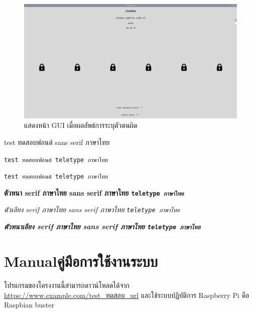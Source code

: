\begin{figure}[!ht]
    \begin{center}
      \includegraphics[scale=.4]{pic/comfirm_page.png}
      \caption[wrong predict]{แสดงหน้า GUI เมื่อผลลัพธ์การระบุตัวตนผิด}
      \label{fig:com_page}
    \end{center}
  \end{figure}



\newpage

\textsf{test ทดสอบฟอนต์ sans serif ภาษาไทย}

\verb+test ทดสอบฟอนต์ teletype ภาษาไทย+

\texttt{test ทดสอบฟอนต์ teletype ภาษาไทย}

\textbf{ตัวหนา serif ภาษาไทย \textsf{sans serif ภาษาไทย} \texttt{teletype ภาษาไทย}}

\textit{ตัวเอียง serif ภาษาไทย \textsf{sans serif ภาษาไทย} \texttt{teletype ภาษาไทย}}

\textbf{\textit{ตัวหนาเอียง serif ภาษาไทย \textsf{sans serif ภาษาไทย} \texttt{teletype ภาษาไทย}}}






\chapter{\ifenglish Manual\else คู่มือการใช้งานระบบ\fi}

โปรแกรมของโครงงานนี้สามารถดาวน์โหลดได้จาก \url{https://www.example.com/test_ทดสอบ_url} 
และใช้ระบบปฏิบัติการ Raspberry Pi คือ Raspbian buster

